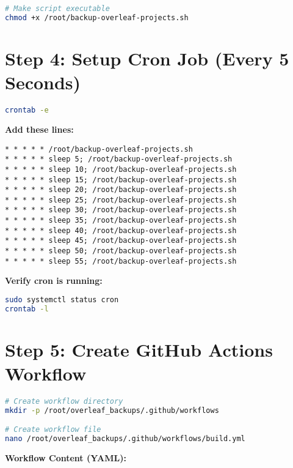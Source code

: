 \begin{lstlisting}[language=bash]
# Make script executable
chmod +x /root/backup-overleaf-projects.sh
\end{lstlisting}

\section{Step 4: Setup Cron Job (Every 5 Seconds)}

\begin{lstlisting}[language=bash]
crontab -e
\end{lstlisting}

\textbf{Add these lines:}

\begin{lstlisting}
* * * * * /root/backup-overleaf-projects.sh
* * * * * sleep 5; /root/backup-overleaf-projects.sh
* * * * * sleep 10; /root/backup-overleaf-projects.sh
* * * * * sleep 15; /root/backup-overleaf-projects.sh
* * * * * sleep 20; /root/backup-overleaf-projects.sh
* * * * * sleep 25; /root/backup-overleaf-projects.sh
* * * * * sleep 30; /root/backup-overleaf-projects.sh
* * * * * sleep 35; /root/backup-overleaf-projects.sh
* * * * * sleep 40; /root/backup-overleaf-projects.sh
* * * * * sleep 45; /root/backup-overleaf-projects.sh
* * * * * sleep 50; /root/backup-overleaf-projects.sh
* * * * * sleep 55; /root/backup-overleaf-projects.sh
\end{lstlisting}

\textbf{Verify cron is running:}

\begin{lstlisting}[language=bash]
sudo systemctl status cron
crontab -l
\end{lstlisting}

\section{Step 5: Create GitHub Actions Workflow}

\begin{lstlisting}[language=bash]
# Create workflow directory
mkdir -p /root/overleaf_backups/.github/workflows

# Create workflow file
nano /root/overleaf_backups/.github/workflows/build.yml
\end{lstlisting}

\textbf{Workflow Content (YAML):}

